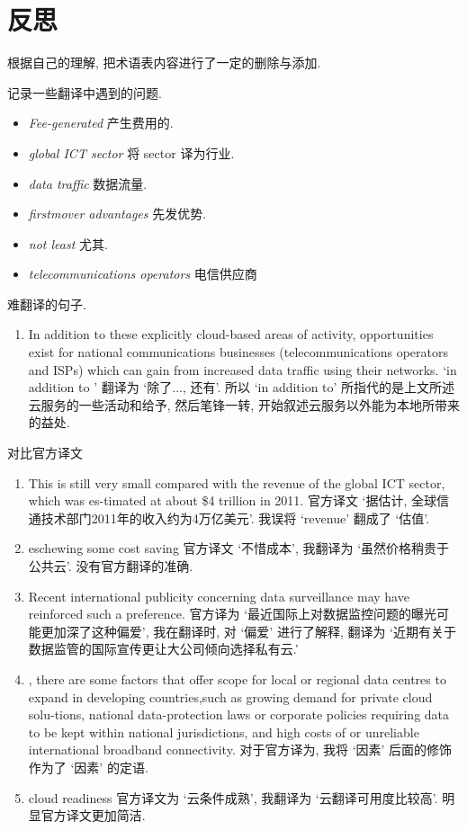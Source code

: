 \documentclass[a4paper, UTF8, 12pt]{article}
\begin{document}
\section{反思}

根据自己的理解, 把术语表内容进行了一定的删除与添加.

记录一些翻译中遇到的问题.

\begin{itemize}
    \item \emph{Fee-generated} 产生费用的.
    \item \emph{global ICT sector} 将 sector 译为行业. 
    \item \emph{data traffic} 数据流量.
    \item \emph{firstmover advantages} 先发优势.
    \item \emph{not least} 尤其.
    \item \emph{telecommunications operators} 电信供应商
\end{itemize}

难翻译的句子.

\begin{enumerate}
    \item In addition to these explicitly cloud-based areas of activity, opportunities exist for national communications businesses (telecommunications operators and ISPs) which can gain from increased data traffic using their networks. `in addition to ' 翻译为 `除了..., 还有'. 所以 `in addition to' 所指代的是上文所述云服务的一些活动和给予, 然后笔锋一转, 开始叙述云服务以外能为本地所带来的益处.  
\end{enumerate}

对比官方译文

\begin{enumerate}
    \item This is still very small compared with the revenue of the global ICT sector, which was es-timated at about \$4 trillion in 2011. 官方译文 `据估计, 全球信通技术部门2011年的收入约为4万亿美元'. 我误将 `revenue' 翻成了 `估值'.
    \item eschewing some cost saving 官方译文 `不惜成本', 我翻译为 `虽然价格稍贵于公共云'. 没有官方翻译的准确.
    \item Recent international publicity concerning data surveillance may have reinforced such a preference. 官方译为 `最近国际上对数据监控问题的曝光可能更加深了这种偏爱', 我在翻译时, 对 `偏爱' 进行了解释, 翻译为 `近期有关于数据监管的国际宣传更让大公司倾向选择私有云.'
    \item , there are some factors that offer scope for local or regional data centres to expand in developing countries,such as growing demand for private cloud solu-tions, national data-protection laws or corporate policies requiring data to be kept within national jurisdictions, and high costs of or unreliable international broadband connectivity. 对于官方译为, 我将 `因素' 后面的修饰作为了 `因素' 的定语.
    \item cloud readiness 官方译文为 `云条件成熟', 我翻译为 `云翻译可用度比较高'. 明显官方译文更加简洁.
\end{enumerate}
\end{document}

